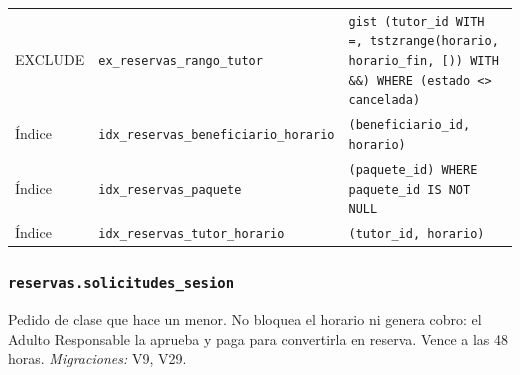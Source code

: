 {\begin{xltabular}{\textwidth}{@{}>{\raggedright\arraybackslash}p{1.7cm} >{\raggedright\arraybackslash}p{4.6cm} L@{}}
    EXCLUDE & \texttt{ex\_\allowbreak{}reservas\_\allowbreak{}rango\_\allowbreak{}tutor} & \texttt{gist (\allowbreak{}tutor\_\allowbreak{}id WITH =,\allowbreak{} tstzrange(\allowbreak{}horario,\allowbreak{} horario\_\allowbreak{}fin,\allowbreak{} \textquotesingle{}[)\textquotesingle{}) WITH \&\&) WHERE (\allowbreak{}estado \textless{}\textgreater{} \textquotesingle{}cancelada\textquotesingle{})} \\
    Índice & \texttt{idx\_\allowbreak{}reservas\_\allowbreak{}beneficiario\_\allowbreak{}horario} & \texttt{(\allowbreak{}beneficiario\_\allowbreak{}id,\allowbreak{} horario)} \\
    Índice & \texttt{idx\_\allowbreak{}reservas\_\allowbreak{}paquete} & \texttt{(\allowbreak{}paquete\_\allowbreak{}id) WHERE paquete\_\allowbreak{}id IS NOT NULL} \\
    Índice & \texttt{idx\_\allowbreak{}reservas\_\allowbreak{}tutor\_\allowbreak{}horario} & \texttt{(\allowbreak{}tutor\_\allowbreak{}id,\allowbreak{} horario)} \\
\end{xltabular}
}

\subsubsection{\texorpdfstring{\texttt{reservas.solicitudes\_\allowbreak{}sesion}}{reservas.solicitudes\_sesion}}\label{dd:reservas.solicitudes_sesion}

Pedido de clase que hace un menor. No bloquea el horario ni genera cobro: el Adulto Responsable la aprueba y paga para convertirla en reserva. Vence a las 48 horas. \emph{Migraciones:} V9, V29.

